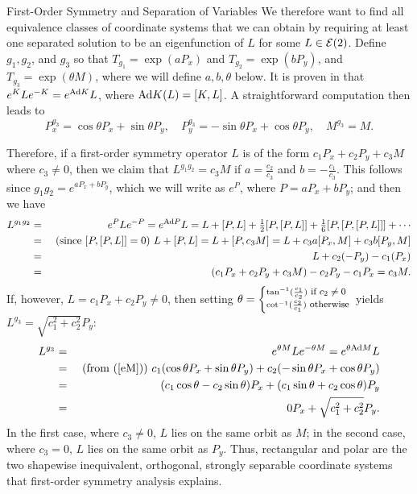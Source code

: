 \begin{section}{First-Order Symmetry and Separation of Variables}
We therefore want to find all equivalence classes of coordinate systems that we can obtain by requiring at least one separated solution to be an eigenfunction of $L$ for some $L \in \mathcal{E}(2)$.  Define $g_1, g_2$, and $g_3$ so that $T_{g_1} = \exp(a P_x)$ and $T_{g_2} = \exp(b P_y)$, and $T_{g_3} = \exp(\theta M)$, where we will define $a,b,\theta$ below.  It is proven in \cite[p.~66]{hausner} that $e^{K}Le^{-K} = e^{\mathrm{Ad} K}L$, where $\mathrm{Ad} K(L) = [K,L]$.  A straightforward computation then leads to
\begin{equation}
\label{eM}
P_x^{g_3} = \cos \theta P_x + \sin \theta P_y, \quad P_y^{g_3} = -\sin \theta P_x + \cos \theta P_y, \quad M^{g_3} = M.
\end{equation}

Therefore, if a first-order symmetry operator $L$ is of the form $c_1 P_x + c_2 P_y + c_3 M$ where $c_3 \not= 0$, then we claim that $L^{g_1 g_2} = c_3 M$ if $a = \frac{c_2}{c_3}$ and $b = -\frac{c_1}{c_3}$.  This follows since $g_1 g_2 = e^{aP_x + bP_y}$, which we will write as $e^P$, where $P = aP_x + bP_y$; and then we have
\begin{eqnarray*}
L^{g_1 g_2} & = & e^P L e^{-P} = e^{\mathrm{Ad} P} L = L + [P,L] + \textstyle{\frac{1}{2}}[P,[P,L]] + \textstyle{\frac{1}{6}}[P,[P,[P,L]]] + \cdots \\
 & = & \mbox{ (since $[P,[P,L]] = 0$) } L + [P,L] = L + [P,c_3 M] = L + c_3 a [P_x,M] + c_3 b [P_y,M] \\
 & = & L + c_2 (-P_y) - c_1 (P_x) \\
 & = & (c_1 P_x + c_2 P_y + c_3 M) - c_2 P_y - c_1 P_x = c_3 M.
\end{eqnarray*}
If, however, $L = c_1 P_x + c_2 P_y \not= 0$, then setting $\theta = \left\{_{\cot^{-1}(\frac{c_2}{c_1}) \mbox{\footnotesize{ otherwise}}}^{\tan^{-1}(\frac{c_1}{c_2}) \mbox{\footnotesize{ if $c_2 \not= 0$}}}\right.$ yields $L^{g_3} = \sqrt{c_1^2 + c_2^2}P_y$:
\begin{eqnarray*}
L^{g_3} & = & e^{\theta M} L e^{-\theta M} = e^{\theta \mathrm{Ad} M} L \\
 & = & \mbox{ (from (\ref{eM})) } c_1 (\cos \theta P_x + \sin \theta P_y) + c_2(-\sin \theta P_x + \cos \theta P_y) \\
 & = & (c_1 \cos \theta - c_2 \sin \theta) P_x + (c_1 \sin \theta + c_2 \cos \theta) P_y \\
 & = & 0 P_x + \sqrt{c_1^2 + c_2^2}P_y.
\end{eqnarray*}
In the first case, where $c_3 \not= 0$, $L$ lies on the same orbit as $M$; in the second case, where $c_3 = 0$, $L$ lies on the same orbit as $P_y$.  Thus, rectangular and polar are the two shapewise inequivalent, orthogonal, strongly separable coordinate systems that first-order symmetry analysis explains.

\end{section}

